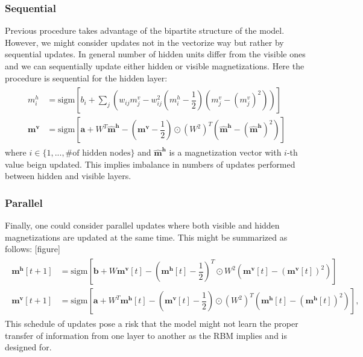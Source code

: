 \documentclass[../report/report.tex]{subfiles}
\begin{document}
\subsubsection{Sequential}
Previous procedure takes advantage of the bipartite structure of the model. However, we might consider updates not in the vectorize way but rather by sequential updates. In general number of hidden units differ from the visible ones and we can sequentially update either hidden or visible magnetizations. Here the procedure is sequential for the hidden layer:
\begin{align}
\begin{split}
m_i^{h} & = \text{sigm} \left[b_i + \sum_j \left( w_{ij}m_j^{v} - w_{ij}^2  (m_i^h - \dfrac{1}{2}) \left(m_j^v - (m_j^v)^2 \right)  \right)\right]  \\
\mathbf{m}^{\mathbf{v}} & = \text{sigm} \left[  \mathbf{a} + W^T \hat{\mathbf{m}}^{\mathbf{h}} -\left( \mathbf{m}^{\mathbf{v}} - \dfrac{1}{2}\right) \odot (W^2)^T  \left(\hat{\mathbf{m}}^{\mathbf{h}} - (\hat{\mathbf{m}}^{\mathbf{h}})^2 \right) \right]
\end{split}
\end{align}
where $i \in \{1, ..., \text{\# of hidden nodes}\}$ and $\hat{\mathbf{m}}^{\mathbf{h}}$ is a magnetization vector with $i$-th value beign updated. This implies imbalance in numbers of updates performed between hidden and visible layers.

\subsubsection{Parallel}
Finally, one could consider parallel updates where both visible and hidden magnetizations are updated at the same time. This might be summarized as follows:
[figure]
\begin{align}
\begin{split}
\mathbf{m}^{\mathbf{h}}[t+1] & = \text{sigm} \left[  \mathbf{b} + W \mathbf{m}^{\mathbf{v}}[t] - \left( \mathbf{m}^{\mathbf{h}}[t] - \dfrac{1}{2}\right)^T \odot W^2 \left( \mathbf{m}^{\mathbf{v}}[t] - ( \mathbf{m}^{\mathbf{v}}[t])^2 \right) \right] \\
\mathbf{m}^{\mathbf{v}}[t+1] & = \text{sigm} \left[  \mathbf{a} + W^T \mathbf{m}^{\mathbf{h}}[t] -\left( \mathbf{m}^{\mathbf{v}}[t] - \dfrac{1}{2}\right) \odot (W^2)^T  \left(\mathbf{m}^{\mathbf{h}}[t] - (\mathbf{m}^{\mathbf{h}}[t])^2 \right) \right],
\end{split}
\end{align}
This schedule of updates pose a risk that the model might not learn the proper transfer of information from one layer to another as the RBM implies and is designed for.
\end{document}

